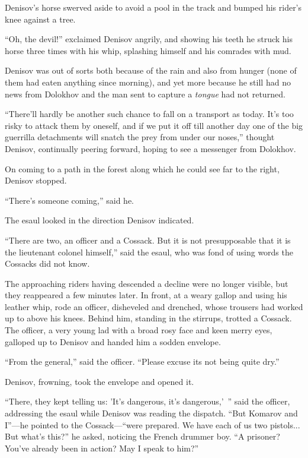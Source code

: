 Denisov's horse swerved aside to avoid a pool in the track and
bumped his rider's knee against a tree.

``Oh, the devil!'' exclaimed Denisov angrily, and showing his
teeth he struck his horse three times with his whip, splashing
himself and his comrades with mud.

Denisov was out of sorts both because of the rain and also from
hunger (none of them had eaten anything since morning), and yet
more because he still had no news from Dolokhov and the man sent
to capture a \emph{tongue} had not returned.

``There'll hardly be another such chance to fall on a transport
as today.  It's too risky to attack them by oneself, and if we
put it off till another day one of the big guerrilla detachments
will snatch the prey from under our noses,'' thought Denisov,
continually peering forward, hoping to see a messenger from
Dolokhov.

On coming to a path in the forest along which he could see far to
the right, Denisov stopped.

``There's someone coming,'' said he.

The esaul looked in the direction Denisov indicated.

``There are two, an officer and a Cossack. But it is not
presupposable that it is the lieutenant colonel himself,'' said
the esaul, who was fond of using words the Cossacks did not know.

The approaching riders having descended a decline were no longer
visible, but they reappeared a few minutes later. In front, at a
weary gallop and using his leather whip, rode an officer,
disheveled and drenched, whose trousers had worked up to above
his knees. Behind him, standing in the stirrups, trotted a
Cossack. The officer, a very young lad with a broad rosy face and
keen merry eyes, galloped up to Denisov and handed him a sodden
envelope.

``From the general,'' said the officer. ``Please excuse its not
being quite dry.''

Denisov, frowning, took the envelope and opened it.

``There, they kept telling us: 'It's dangerous, it's dangerous,'\
'' said the officer, addressing the esaul while Denisov was
reading the dispatch. ``But Komarov and I''---he pointed to the
Cossack---``were prepared. We have each of us two pistols... But
what's this?'' he asked, noticing the French drummer boy. ``A
prisoner? You've already been in action? May I speak to him?''

